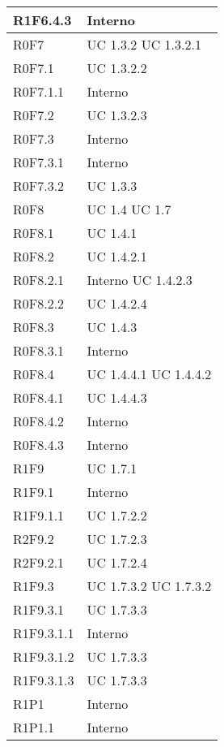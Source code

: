 \begin{center}
\begin{longtable}{| p{4cm} | p{4cm} |}
		\hline
		R1F6.4.3  &  Interno \\
		\hline
		R0F7  &  UC 1.3.2 \newline UC 1.3.2.1 \\
		\hline
		R0F7.1  &  UC 1.3.2.2 \\
		\hline
		R0F7.1.1  &  Interno \\
		\hline
		R0F7.2  &  UC 1.3.2.3 \\
		\hline
		R0F7.3  &  Interno \\
		\hline
		R0F7.3.1  &  Interno \\
		\hline
		R0F7.3.2  &  UC 1.3.3 \\
		\hline
		R0F8  &  UC 1.4 \newline UC 1.7 \\
		\hline
		R0F8.1  &  UC 1.4.1 \\
		\hline
		R0F8.2  &  UC 1.4.2.1 \\
		\hline
		R0F8.2.1  &  Interno \newline UC 1.4.2.3 \\
		\hline
		R0F8.2.2  &  UC 1.4.2.4 \\
		\hline
		R0F8.3  &  UC 1.4.3 \\
		\hline
		R0F8.3.1  &  Interno \\
		\hline
		R0F8.4  &  UC 1.4.4.1 \newline UC 1.4.4.2 \\
		\hline
		R0F8.4.1  &  UC 1.4.4.3 \\
		\hline
		R0F8.4.2  &  Interno \\
		\hline
		R0F8.4.3  &  Interno \\
		\hline
		R1F9  &  UC 1.7.1 \\
		\hline
		R1F9.1  &  Interno \\
		\hline
		R1F9.1.1  &  UC 1.7.2.2 \\
		\hline
		R2F9.2  &  UC 1.7.2.3 \\
		\hline
		R2F9.2.1  &  UC 1.7.2.4 \\
		\hline
		R1F9.3  &  UC 1.7.3.2 \newline UC 1.7.3.2 \\
		\hline
		R1F9.3.1  &  UC 1.7.3.3\\
		\hline
		R1F9.3.1.1  &  Interno \\
		\hline
		R1F9.3.1.2  &  UC 1.7.3.3\\
		\hline
		R1F9.3.1.3  &  UC 1.7.3.3\\
		\hline

		R1P1  &  Interno \\
		\hline
		R1P1.1  &  Interno \\
		\hline


\end{longtable}
\end{center}
